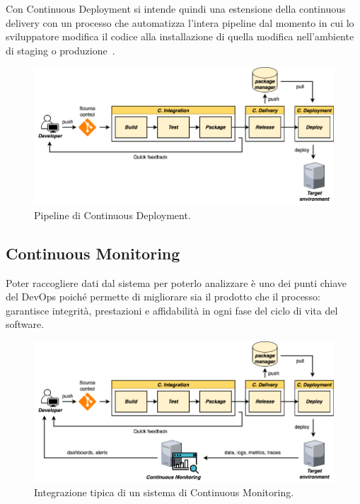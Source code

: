 Con Continuous Deployment si intende quindi una estensione della continuous delivery con un processo che automatizza l'intera pipeline dal momento in cui lo sviluppatore modifica il codice alla installazione di quella modifica nell'ambiente di staging o produzione~\cite{krief2019learning}.

\begin{figure}[H]
    \centering
    \includegraphics[width=1\textwidth]{img/cdeploy-pipeline.png}
    \caption{Pipeline di Continuous Deployment.}
    \label{cdeploy-pipeline}
\end{figure}

\subsection{Continuous Monitoring}
Poter raccogliere dati dal sistema per poterlo analizzare è uno dei punti chiave del DevOps poiché permette di migliorare sia il prodotto che il processo: garantisce integrità, prestazioni e affidabilità in ogni fase del ciclo di vita del software.

\begin{figure}[H]
    \centering
    \includegraphics[width=1\textwidth]{img/ci-monitoring.png}
    \caption{Integrazione tipica di un sistema di Continuous Monitoring.}
    \label{ci-monitoring}
\end{figure}

